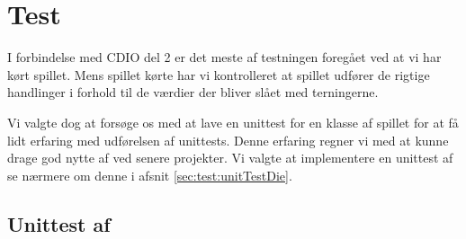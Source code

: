 \chapter{Test}\label{chap:test}
I forbindelse med CDIO del 2 er det meste af testningen foregået ved at vi har kørt spillet. Mens spillet kørte har vi kontrolleret at spillet udfører de rigtige handlinger i forhold til de værdier der bliver slået med terningerne.

Vi valgte dog at forsøge os med at lave en unittest for en klasse af spillet for at få lidt erfaring med udførelsen af unittests. Denne erfaring regner vi med at kunne drage god nytte af ved senere projekter. Vi valgte at implementere en unittest af  se nærmere om denne i afsnit \vref{sec:test:unitTestDie}.

\section{Unittest af }\label{sec:test:unitTestDie}